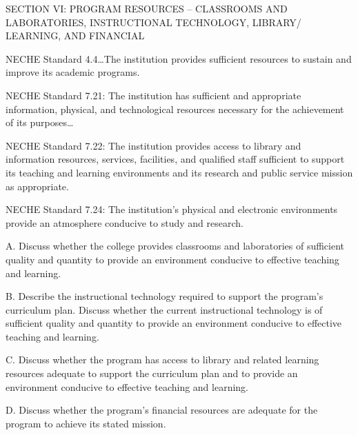 SECTION VI: PROGRAM RESOURCES – CLASSROOMS AND LABORATORIES, INSTRUCTIONAL TECHNOLOGY, LIBRARY/ LEARNING, AND FINANCIAL

NECHE Standard 4.4…The institution provides sufficient resources to sustain and improve its academic programs.

NECHE Standard 7.21: The institution has sufficient and appropriate information, physical, and technological resources necessary for the achievement of its purposes…

NECHE Standard 7.22: The institution provides access to library and information resources, services, facilities, and qualified staff sufficient to support its teaching and learning environments and its research and public service mission as appropriate.

NECHE Standard 7.24: The institution’s physical and electronic environments provide an atmosphere conducive to study and research.


A. Discuss whether the college provides classrooms and laboratories of sufficient quality and quantity to provide an environment conducive to effective teaching and learning.



B. Describe the instructional technology required to support the program’s curriculum plan. Discuss whether the current instructional technology is of sufficient quality and quantity to provide an environment conducive to effective teaching and learning.



C. Discuss whether the program has access to library and related learning resources adequate to support the curriculum plan and to provide an environment conducive to effective teaching and learning.



D. Discuss whether the program’s financial resources are adequate for the program to achieve its stated mission.
